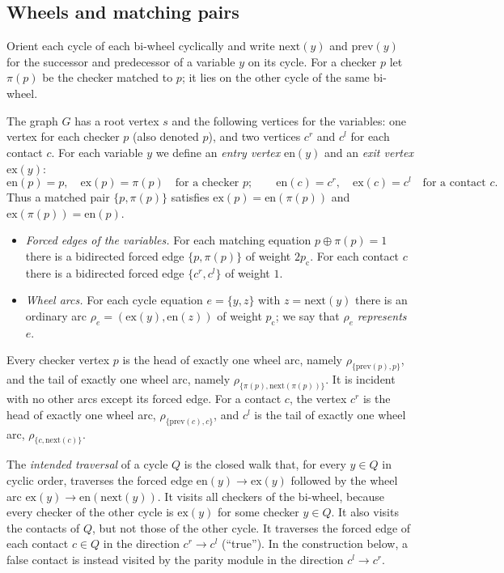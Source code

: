 \documentclass[11pt]{amsart}
\theoremstyle{definition}
\theoremstyle{remark}
\numberwithin{equation}{section}
\newcommand{\en}{\mathrm{en}}
\newcommand{\ex}{\mathrm{ex}}
\newcommand{\nxt}{\mathrm{next}}
\newcommand{\prv}{\mathrm{prev}}
\newcommand{\pc}{p_{\mathrm{c}}}
\newcommand{\Gh}{\widehat{G}}
\begin{document}
\subsection{Wheels and matching pairs}\label{sec:wheels}
Orient each cycle of each bi-wheel cyclically and write $\nxt(y)$ and $\prv(y)$ for the successor and predecessor of a variable $y$ on its cycle. For a checker $p$ let $\pi(p)$ be the checker matched to $p$; it lies on the other cycle of the same bi-wheel.

The graph $\Gh$ has a root vertex $s$ and the following vertices for the variables: one vertex for each checker $p$ (also denoted $p$), and two vertices $c^{r}$ and $c^{l}$ for each contact $c$. For each variable $y$ we define an \emph{entry vertex} $\en(y)$ and an \emph{exit vertex} $\ex(y)$:
\[
\en(p)=p,\quad \ex(p)=\pi(p)\quad\text{for a checker }p;\qquad \en(c)=c^{r},\quad \ex(c)=c^{l}\quad\text{for a contact }c.
\]
Thus a matched pair $\{p,\pi(p)\}$ satisfies $\ex(p)=\en(\pi(p))$ and $\ex(\pi(p))=\en(p)$.

\begin{itemize}[leftmargin=2em]
\item \emph{Forced edges of the variables.} For each matching equation $p\oplus\pi(p)=1$ there is a bidirected forced edge $\{p,\pi(p)\}$ of weight $2\pc$. For each contact $c$ there is a bidirected forced edge $\{c^r,c^l\}$ of weight $1$.
\item \emph{Wheel arcs.} For each cycle equation $e=\{y,z\}$ with $z=\nxt(y)$ there is an ordinary arc $\rho_e=(\ex(y),\en(z))$ of weight $\pc$; we say that $\rho_e$ \emph{represents} $e$.
\end{itemize}
Every checker vertex $p$ is the head of exactly one wheel arc, namely $\rho_{\{\prv(p),p\}}$, and the tail of exactly one wheel arc, namely $\rho_{\{\pi(p),\nxt(\pi(p))\}}$. It is incident with no other arcs except its forced edge. For a contact $c$, the vertex $c^r$ is the head of exactly one wheel arc, $\rho_{\{\prv(c),c\}}$, and $c^l$ is the tail of exactly one wheel arc, $\rho_{\{c,\nxt(c)\}}$.

The \emph{intended traversal} of a cycle $Q$ is the closed walk that, for every $y\in Q$ in cyclic order, traverses the forced edge $\en(y)\to\ex(y)$ followed by the wheel arc $\ex(y)\to\en(\nxt(y))$. It visits all checkers of the bi-wheel, because every checker of the other cycle is $\ex(y)$ for some checker $y\in Q$. It also visits the contacts of $Q$, but not those of the other cycle. It traverses the forced edge of each contact $c\in Q$ in the direction $c^r\to c^l$ (``true''). In the construction below, a false contact is instead visited by the parity module in the direction $c^l\to c^r$.
\end{document}
